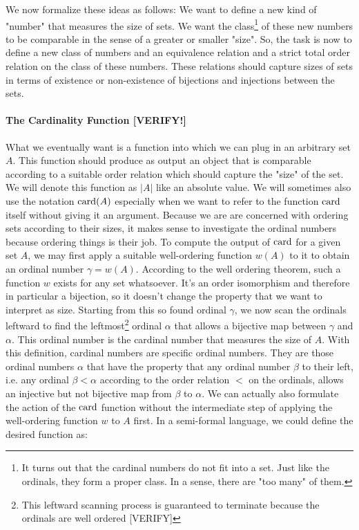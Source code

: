 \medskip
We now formalize these ideas as follows: We want to define a new kind of "number" that measures the size of sets. We want the class\footnote{It turns out that the cardinal numbers do not fit into a set. Just like the ordinals, they form a proper class. In a sense, there are "too many" of them. } of these new numbers to be comparable in the sense of a greater or smaller "size". So, the task is now to define a new class of numbers and an equivalence relation and a strict total order relation on the class of these numbers. These relations should capture sizes of sets in terms of existence or non-existence of bijections and injections between the sets.

\paragraph{The Cardinality Function [VERIFY!]}
What we eventually want is a function into which we can plug in an arbitrary set $A$. This function should produce as output an object that is comparable according to a suitable order relation which should capture the "size" of the set. We will denote this function as $|A|$ like an absolute value. We will sometimes also use the notation $\operatorname{card}(A)$ especially when we want to refer to the function $\operatorname{card}$ itself without giving it an argument. Because we are are concerned with ordering sets according to their sizes, it makes sense to investigate the ordinal numbers because ordering things is their job. To compute the output of $\operatorname{card}$ for a given set $A$, we may first apply a suitable well-ordering function $w(A)$ to it to obtain an ordinal number $\gamma = w(A)$. According to the well ordering theorem, such a function $w$ exists for any set whatsoever. It's an order isomorphism and therefore in particular a bijection, so it doesn't change the property that we want to interpret as size. Starting from this so found ordinal $\gamma$, we now scan the ordinals leftward to find the leftmost\footnote{This leftward scanning process is guaranteed to terminate because the ordinals are well ordered [VERIFY]} ordinal $\alpha$ that allows a bijective map between $\gamma$ and $\alpha$. This ordinal number is the cardinal number that measures the size of $A$. With this definition, cardinal numbers are specific ordinal numbers. They are those ordinal numbers $\alpha$ that have the property that any ordinal number $\beta$ to their left, i.e. any ordinal $\beta < \alpha$ according to the order relation $<$ on the ordinals, allows an injective but not bijective map from $\beta$ to $\alpha$. We can actually also formulate the action of the $\operatorname{card}$ function without the intermediate step of applying the well-ordering function $w$ to $A$ first. In a semi-formal language, we could define the desired function as:
